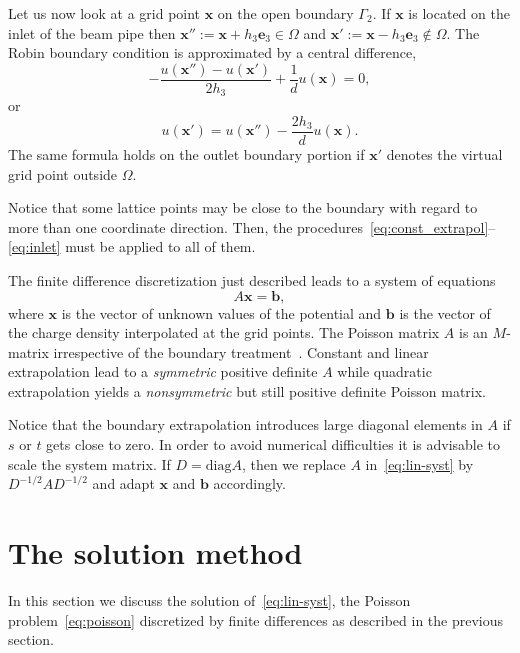 \documentclass[a4paper,10pt,3p,final,pdftex]{elsarticle}
\begin{document}
Let us now look at a grid point $\mathbf{x}$ on the open boundary
$\Gamma_2$.  If $\mathbf{x}$ is located on the inlet of the beam pipe
then $\mathbf{x}'':=\mathbf{x}\! +\! h_3\mathbf{e}_3 \in \Omega$ and
$\mathbf{x}':=\mathbf{x}\! -\! h_3\mathbf{e}_3 \not\in \Omega$.  The
Robin boundary condition is approximated by a central difference,
\begin{displaymath}
  - \frac{u(\mathbf{x}'') - u(\mathbf{x}')}{2h_3}
  + \frac{1}{d}u(\mathbf{x}) = 0,
\end{displaymath}
or
\begin{equation}  \label{eq:inlet}
  u(\mathbf{x}') = u(\mathbf{x}'') - \frac{2h_3}{d}u(\mathbf{x}).
\end{equation}
The same formula holds on the outlet boundary portion if $\mathbf{x}'$
denotes the virtual grid point outside $\Omega$.

Notice that some lattice points may be close to the boundary with regard
to more than one coordinate direction.  Then, the
procedures~\eqref{eq:const_extrapol}--\eqref{eq:inlet} must be
applied to all of them.  

The finite difference discretization just described leads to a system of
equations
\begin{equation} \label{eq:lin-syst}
  A \mathbf{x} = \mathbf{b},
\end{equation}
where $\mathbf{x}$ is the vector of unknown values of the potential and
$\mathbf{b}$ is the vector of the charge density interpolated at the grid
points.
The Poisson matrix $A$ is an $M$-matrix irrespective of the boundary
treatment~\cite{hack:94}.  Constant and linear extrapolation lead to a
\emph{symmetric} positive definite $A$ while quadratic extrapolation
yields a \emph{nonsymmetric} but still positive definite Poisson matrix.

Notice that the boundary extrapolation introduces large diagonal
elements in $A$ if $s$ or $t$ gets close to zero.  In order to avoid
numerical difficulties it is advisable to scale the system matrix.  If
$D = \mbox{diag}{A}$, then we replace $A$ in~\eqref{eq:lin-syst} by
$D^{-1/2} A D^{-1/2}$ and adapt $\mathbf{x}$ and $\mathbf{b}$
accordingly.  

\section{The solution method}
\label{sec:method}

In this section we discuss the solution of~\eqref{eq:lin-syst}, the
Poisson problem~\eqref{eq:poisson} discretized by finite differences as
described in the previous section.
\end{document}
